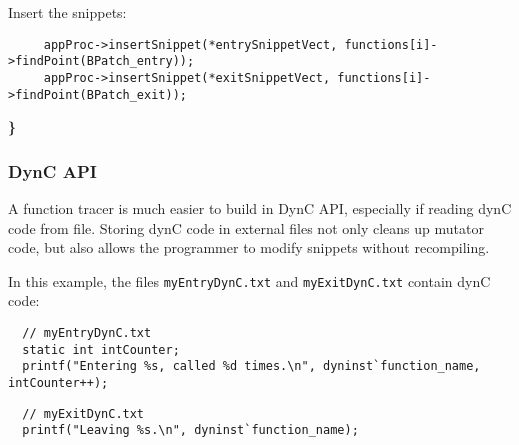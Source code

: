 \documentclass{article}
\begin{document}
Insert the snippets:
\begin{lstlisting}
     appProc->insertSnippet(*entrySnippetVect, functions[i]->findPoint(BPatch_entry));
     appProc->insertSnippet(*exitSnippetVect, functions[i]->findPoint(BPatch_exit));
\end{lstlisting}

\noindent \textbf{\}}

\begin{center} 
\end{center}

\begin{comment}
  // find points
  std::vector<BPatch_point *> *entryPoints = functions[i]->findPoint(BPatch_entry);
  std::vector<BPatch_point *> *exitPoints = functions[i]->findPoint(BPatch_exit);

  // insert snippets
  appProc->insertSnippet(BPatch_sequence(entrySnippetVect), entryPoints);
  appProc->insertSnippet(BPatch_sequence(exitSnippetVect), exitPoints);
}

  // run mutatee
  appProc->continueExecution();
\end{comment}

\pagebreak


\subsubsection{DynC API}

A function tracer is much easier to build in DynC API, especially if reading dynC code from file. Storing dynC code in external files not only cleans up mutator code, but also allows the programmer to modify snippets without recompiling.

\vspace{0.5cm}


\noindent In this example, the files \verb!myEntryDynC.txt! and \verb!myExitDynC.txt! contain dynC code:

\begin{lstlisting}
  // myEntryDynC.txt
  static int intCounter;
  printf("Entering %s, called %d times.\n", dyninst`function_name, intCounter++);
\end{lstlisting}

\begin{lstlisting}
  // myExitDynC.txt
  printf("Leaving %s.\n", dyninst`function_name);
\end{lstlisting}
\end{document}
